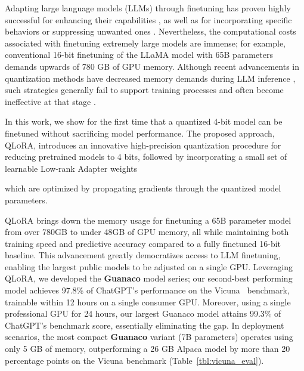 Adapting large language models (LLMs) through finetuning has proven highly successful for enhancing their capabilities \citep{min2021metaicl, wei2021finetuned, ouyang2022training, wang2022super, wang2022self, liu2022few}, as well as for incorporating specific behaviors or suppressing unwanted ones \citep{ouyang2022training,askell2021general,bai2022training}. Nevertheless, the computational costs associated with finetuning extremely large models are immense; for example, conventional 16-bit finetuning of the LLaMA model with 65B parameters~\citep{touvron2023llama} demands upwards of 780 GB of GPU memory. Although recent advancements in quantization methods have decreased memory demands during LLM inference \citep{dettmers2022llm, dettmers2022case, frantar2022gptq, xiao2022smoothquant}, such strategies generally fail to support training processes and often become ineffective at that stage \citep{wortsman2023stable}.

In this work, we show for the first time that a quantized 4-bit model can be finetuned without sacrificing model performance. The proposed approach, \textsc{QLoRA}, introduces an innovative high-precision quantization procedure for reducing pretrained models to 4 bits, followed by incorporating a small set of learnable Low-rank Adapter weights \citep{hu2021lora}

which are optimized by propagating gradients through the quantized model parameters.

\textsc{QLoRA} brings down the memory usage for finetuning a 65B parameter model from over 780GB to under 48GB of GPU memory, all while maintaining both training speed and predictive accuracy compared to a fully finetuned 16-bit baseline. This advancement greatly democratizes access to LLM finetuning, enabling the largest public models to be adjusted on a single GPU. Leveraging \textsc{QLoRA}, we developed the \textbf{Guanaco} model series; our second-best performing model achieves 97.8\% of ChatGPT’s performance on the Vicuna~\citep{vicuna2023} benchmark, trainable within 12 hours on a single consumer GPU. Moreover, using a single professional GPU for 24 hours, our largest Guanaco model attains 99.3\% of ChatGPT’s benchmark score, essentially eliminating the gap. In deployment scenarios, the most compact \textbf{Guanaco} variant (7B parameters) operates using only 5 GB of memory, outperforming a 26 GB Alpaca model by more than 20 percentage points on the Vicuna benchmark (Table~\ref{tbl:vicuna_eval}).

